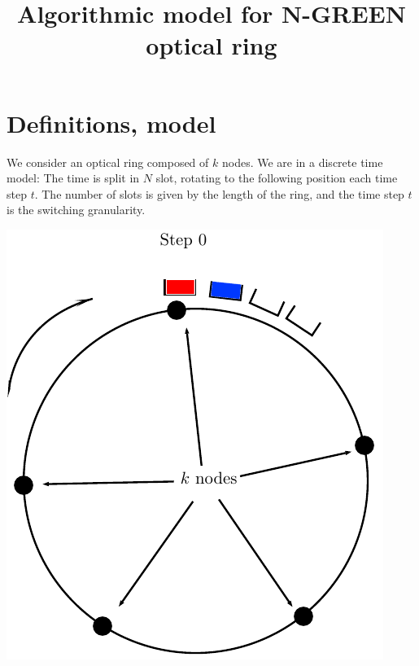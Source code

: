 \documentclass[a4paper,10pt]{article}
\title{Algorithmic model for N-GREEN optical ring}
\begin{document}
\maketitle

\section*{Definitions, model}
We consider an optical ring composed of $k$ nodes.
We are in a discrete time model: The time is split in $N$ slot, rotating to the following position each time step $t$. The number of slots is given by the length of the ring, and the time step $t$ is the switching granularity. 
\begin{center}   

      \includegraphics[scale=0.5]{anneau1.pdf}
      \hspace{3cm}

\end{center}
\end{document}

